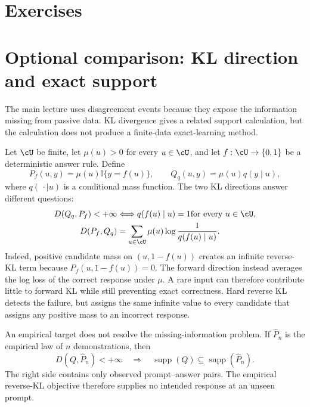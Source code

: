 \documentclass[11pt,twoside]{article}
\newcommand{\I}{\mathbb I}
\newcommand{\KL}{D}
\theoremstyle{definition}
\theoremstyle{remark}
\begin{document}
\section{Exercises}
\label{sec:exercises}

\exerciseinstructions
\setcounter{courseexercise}{0}





\appendix
\section{Optional comparison: KL direction and exact support}
\label{app:kl-directions}

The main lecture uses disagreement events because they expose the information
missing from passive data. KL divergence gives a related support calculation,
but the calculation does not produce a finite-data exact-learning method.

Let \(\cU\) be finite, let \(\mu(u)>0\) for every \(u\in\cU\), and let
\(f:\cU\to\{0,1\}\) be a deterministic answer rule. Define
\begin{equation}
 P_f(u,y)=\mu(u)\I\{y=f(u)\},
 \qquad
 Q_q(u,y)=\mu(u)q(y\mid u),
 \label{eq:appendix-kl-laws}
\end{equation}
where \(q(\,\cdot\mid u)\) is a conditional mass function. The two KL
directions answer different questions:
\begin{align}
 \KL(Q_q,P_f)<+\infty
 &\quad\Longleftrightarrow\quad
 q(f(u)\mid u)=1
 \quad\text{for every }u\in\cU,
 \label{eq:appendix-reverse-exact}\\
 \KL(P_f,Q_q)
 &=\sum_{u\in\cU}\mu(u)\log\frac{1}{q(f(u)\mid u)}.
 \label{eq:appendix-forward-kl}
\end{align}
Indeed, positive candidate mass on \((u,1-f(u))\) creates an infinite
reverse-KL term because \(P_f(u,1-f(u))=0\). The forward direction instead
averages the log loss of the correct response under \(\mu\). A rare input can
therefore contribute little to forward KL while still preventing exact
correctness. Hard reverse KL detects the failure, but assigns the same infinite
value to every candidate that assigns any positive mass to an incorrect
response.

An empirical target does not resolve the missing-information problem. If
\(\widehat P_n\) is the empirical law of \(n\) demonstrations, then
\begin{equation}
 \KL(Q,\widehat P_n)<+\infty
 \quad\Longrightarrow\quad
 \operatorname{supp}(Q)
 \subseteq\operatorname{supp}(\widehat P_n).
 \label{eq:appendix-empirical-support}
\end{equation}
The right side contains only observed prompt--answer pairs. The empirical
reverse-KL objective therefore supplies no intended response at an unseen
prompt.
\end{document}
